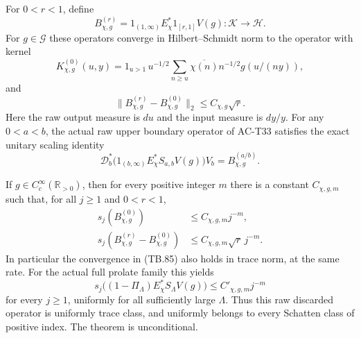 \begin{theorem}
\label{AC-T34}
For \(0<r<1\), define
\[
 B_{\chi,g}^{(r)}
       =1_{(1,\infty)}E_\chi^*1_{[r,1]}V(g):
                       \mathcal K\longrightarrow\mathcal H .
 \tag{TB.83}
\]
For \(g\in\mathscr G\) these operators converge in
Hilbert--Schmidt norm to the operator with kernel
\[
 K_{\chi,g}^{(0)}(u,y)
     =1_{u>1}\,u^{-1/2}
          \sum_{n\geq u}\overline{\chi(n)}n^{-1/2}g(u/(ny)),
 \tag{TB.84}
\]
and
\[
       \|B_{\chi,g}^{(r)}-B_{\chi,g}^{(0)}\|_2
                         \leq C_{\chi,g}\sqrt r .
 \tag{TB.85}
\]
Here the raw output measure is \(du\) and the input
measure is \(dy/y\).
For any \(0<a<b\), the actual raw upper boundary operator
of AC-T33 satisfies the exact unitary scaling identity
\[
 \mathscr D_b^*
       \bigl(1_{(b,\infty)}E_\chi^*S_{a,b}V(g)\bigr)V_b
                         =B_{\chi,g}^{(a/b)}.
 \tag{TB.86}
\]

If \(g\in C_c^\infty(\mathbb R_{>0})\), then for every
positive integer \(m\) there is a constant \(C_{\chi,g,m}\)
such that, for all \(j\geq1\) and \(0<r<1\),
\[
 \begin{split}
 s_j(B_{\chi,g}^{(0)})&\leq C_{\chi,g,m}j^{-m},\\
 s_j(B_{\chi,g}^{(r)}-B_{\chi,g}^{(0)})
                          &\leq C_{\chi,g,m}\sqrt r\,j^{-m}.
 \end{split}
 \tag{TB.87}
\]
In particular the convergence in (TB.85) also holds in
trace norm, at the same rate.
For the actual full prolate family this yields
\[
 s_j\bigl((1-\Pi_\Lambda)
                 E_\chi^*S_\Lambda V(g)\bigr)
                     \leq C'_{\chi,g,m}j^{-m}
 \tag{TB.88}
\]
for every \(j\geq1\), uniformly for all sufficiently large
\(\Lambda\).
Thus this raw discarded operator is uniformly trace class,
and uniformly belongs to every Schatten class of positive
index.  The theorem is unconditional.
\end{theorem}
